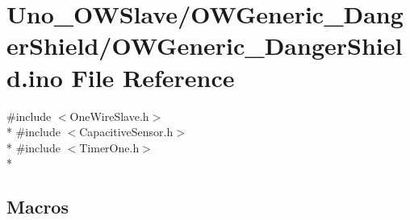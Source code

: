 \hypertarget{OWGeneric__DangerShield_8ino}{\section{Uno\-\_\-\-O\-W\-Slave/\-O\-W\-Generic\-\_\-\-Danger\-Shield/\-O\-W\-Generic\-\_\-\-Danger\-Shield.ino File Reference}
\label{OWGeneric__DangerShield_8ino}
}
{\ttfamily \#include $<$One\-Wire\-Slave.\-h$>$}\\*
{\ttfamily \#include $<$Capacitive\-Sensor.\-h$>$}\\*
{\ttfamily \#include $<$Timer\-One.\-h$>$}\\*
\subsection*{Macros}
